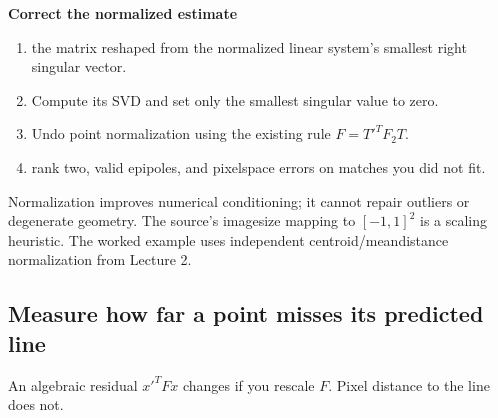 \documentclass[letterpaper,11pt,english,openany,oneside]{jupyterBook}
\begin{document}
\begin{TextbookBox}
\textbf{Correct the normalized estimate}\par\smallskip
\begin{enumerate}
%
\item {}
\sphinxAtStartPar
{} the matrix reshaped from the normalized linear system’s smallest right singular vector.

\item {}
\sphinxAtStartPar
Compute its SVD and set only the smallest singular value to zero.

\item {}
\sphinxAtStartPar
Undo point normalization using the existing rule \(F=T'^TF_2T\).

\item {}
\sphinxAtStartPar
{} rank two, valid epipoles, and pixel\sphinxhyphen{}space errors on matches you did not fit.

\end{enumerate}

\sphinxAtStartPar
Normalization improves numerical conditioning; it cannot repair outliers or degenerate geometry. The source’s image\sphinxhyphen{}size mapping to \([-1,1]^2\) is a scaling heuristic. The worked example uses independent centroid/mean\sphinxhyphen{}distance normalization from Lecture 2.

\end{TextbookBox}



\subsection{Measure how far a point misses its predicted line}
\label{\detokenize{lectures/lecture04/estimation:measure-how-far-a-point-misses-its-predicted-line}}
\sphinxAtStartPar
An algebraic residual \(x'^TFx\) changes if you rescale \(F\). Pixel distance to the line does not.
\end{document}
